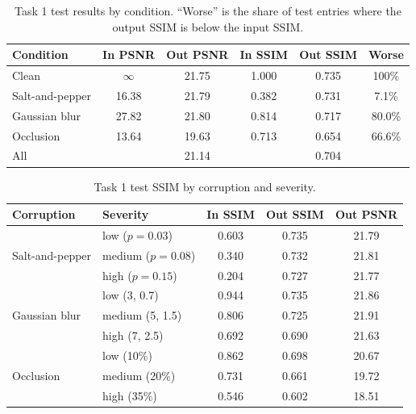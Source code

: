 \documentclass[conference]{IEEEtran}
\begin{document}
\begin{table}[t]
\centering
\caption{Task 1 test results by condition. ``Worse'' is the share of test entries where the output SSIM is below the input SSIM.}
\label{tab:t1_results}
\footnotesize
\setlength{\tabcolsep}{3.5pt}
\begin{tabular}{@{}lccccc@{}}
\toprule
Condition & In PSNR & Out PSNR & In SSIM & Out SSIM & Worse \\
\midrule
Clean & $\infty$ & 21.75 & 1.000 & 0.735 & 100\% \\
Salt-and-pepper & 16.38 & 21.79 & 0.382 & 0.731 & 7.1\% \\
Gaussian blur & 27.82 & 21.80 & 0.814 & 0.717 & 80.0\% \\
Occlusion & 13.64 & 19.63 & 0.713 & 0.654 & 66.6\% \\
\midrule
All & & 21.14 & & 0.704 & \\
\bottomrule
\end{tabular}
\end{table}

\begin{table}[t]
\centering
\caption{Task 1 test SSIM by corruption and severity.}
\label{tab:t1_severity}
\footnotesize
\setlength{\tabcolsep}{3.5pt}
\begin{tabular}{@{}llccc@{}}
\toprule
Corruption & Severity & In SSIM & Out SSIM & Out PSNR \\
\midrule
\multirow{3}{*}{Salt-and-pepper} & low ($p{=}0.03$) & 0.603 & 0.735 & 21.79 \\
 & medium ($p{=}0.08$) & 0.340 & 0.732 & 21.81 \\
 & high ($p{=}0.15$) & 0.204 & 0.727 & 21.77 \\
\midrule
\multirow{3}{*}{Gaussian blur} & low (3, 0.7) & 0.944 & 0.735 & 21.86 \\
 & medium (5, 1.5) & 0.806 & 0.725 & 21.91 \\
 & high (7, 2.5) & 0.692 & 0.690 & 21.63 \\
\midrule
\multirow{3}{*}{Occlusion} & low (10\%) & 0.862 & 0.698 & 20.67 \\
 & medium (20\%) & 0.731 & 0.661 & 19.72 \\
 & high (35\%) & 0.546 & 0.602 & 18.51 \\
\bottomrule
\end{tabular}
\end{table}
\end{document}
